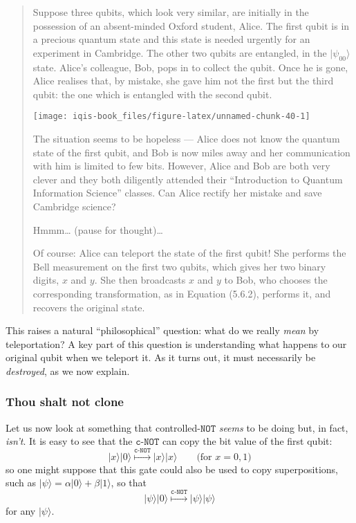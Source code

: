 \documentclass[fleqn]{article}
\begin{document}
\begin{quote}
Suppose three qubits, which look very similar, are initially in the possession of an absent-minded Oxford student, Alice.
The first qubit is in a precious quantum state and this state is needed urgently for an experiment in Cambridge.
The other two qubits are entangled, in the \(|\psi_{00}\rangle\) state. Alice's colleague, Bob, pops in to collect the qubit.
Once he is gone, Alice realises that, by mistake, she gave him not the first but the third qubit: the one which is entangled with the second qubit.

\begin{center}\texttt{[image: iqis-book\_files/figure-latex/unnamed-chunk-40-1]} \end{center}

The situation seems to be hopeless --- Alice does not know the quantum state of the first qubit, and Bob is now miles away and her communication with him is limited to few bits.
However, Alice and Bob are both very clever and they both diligently attended their ``Introduction to Quantum Information Science'' classes.
Can Alice rectify her mistake and save Cambridge science?

Hmmm\ldots{} (pause for thought)\ldots{}

Of course: Alice can teleport the state of the first qubit!
She performs the Bell measurement on the first two qubits, which gives her two binary digits, \(x\) and \(y\).
She then broadcasts \(x\) and \(y\) to Bob, who chooses the corresponding transformation, as in Equation (5.6.2), performs it, and recovers the original state.
\end{quote}

This raises a natural ``philosophical'' question: what do we really \emph{mean} by teleportation?
A key part of this question is understanding what happens to our original qubit when we teleport it.
As it turns out, it must necessarily be \emph{destroyed}, as we now explain.

\hypertarget{thou-shalt-not-clone}{%
\subsubsection{Thou shalt not clone}\label{thou-shalt-not-clone}}

Let us now look at something that controlled-\(\texttt{NOT}\) \emph{seems} to be doing but, in fact, \emph{isn't}.
It is easy to see that the \(\texttt{c-NOT}\) can copy the bit value of the first qubit:
\[
  |x\rangle|0\rangle \overset{\texttt{c-NOT}}{\longmapsto} |x\rangle|x\rangle
  \qquad\text{(for $x=0,1$)}
\]
so one might suppose that this gate could also be used to copy superpositions, such as \(|\psi\rangle = \alpha|0\rangle+\beta|1\rangle\), so that
\[
  |\psi\rangle|0\rangle \overset{\texttt{c-NOT}}{\longmapsto} |\psi\rangle|\psi\rangle
\]
for any \(|\psi\rangle\).
\end{document}
